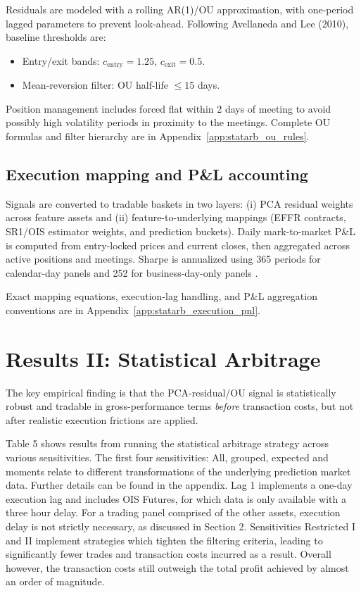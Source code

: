 Residuals are modeled with a rolling AR(1)/OU approximation, with one-period lagged parameters to prevent look-ahead. Following Avellaneda and Lee (2010), baseline thresholds are:
\begin{itemize}
    \item Entry/exit bands: $c_{\text{entry}}=1.25$, $c_{\text{exit}}=0.5$.
    \item Mean-reversion filter: OU half-life $\le 15$ days.
\end{itemize}
Position management includes forced flat within 2 days of meeting to avoid possibly high volatility periods in proximity to the meetings. Complete OU formulas and filter hierarchy are in Appendix~\ref{app:statarb_ou_rules}.

\subsection{Execution mapping and P\&L accounting}

Signals are converted to tradable baskets in two layers: (i) PCA residual weights across feature assets and (ii) feature-to-underlying mappings (EFFR contracts, SR1/OIS estimator weights, and prediction buckets). Daily mark-to-market P\&L is computed from entry-locked prices and current closes, then aggregated across active positions and meetings. Sharpe is annualized using 365 periods for calendar-day panels and 252 for business-day-only panels \cite{sharpe1994}.

Exact mapping equations, execution-lag handling, and P\&L aggregation conventions are in Appendix~\ref{app:statarb_execution_pnl}.


\section{Results II: Statistical Arbitrage}

The key empirical finding is that the PCA-residual/OU signal is statistically robust and tradable in gross-performance terms \emph{before} transaction costs, but not after realistic execution frictions are applied.

Table 5 shows results from running the statistical arbitrage strategy across various sensitivities. The first four sensitivities: All, grouped, expected and moments relate to different transformations of the underlying prediction market data. Further details can be found in the appendix. Lag 1 implements a one-day execution lag and includes OIS Futures, for which data is only available with a three hour delay. For a trading panel comprised of the other assets, execution delay is not strictly necessary, as discussed in Section 2. Sensitivities Restricted I and II implement strategies which tighten the filtering criteria, leading to significantly fewer trades and transaction costs incurred as a result. Overall however, the transaction costs still outweigh the total profit achieved by almost an order of magnitude. 

